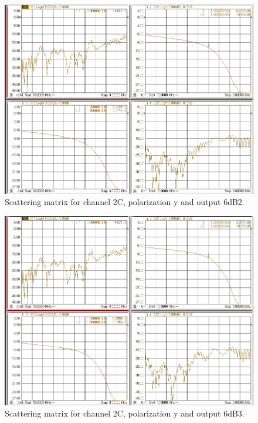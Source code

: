 \documentclass[12pt,a4paper,oneside]{article}
\begin{document}
\begin{figure}[H]
\centering
\includegraphics[width=0.9\linewidth]{VNA_results/2Cy_6dB2.png}
\caption{Scattering matrix for channel 2C, polarization y and output 6dB2.}
\label{fig:2Cy_6dB2}
\end{figure}


\begin{figure}[H]
\centering
\includegraphics[width=0.9\linewidth]{VNA_results/2Cy_6dB3.png}
\caption{Scattering matrix for channel 2C, polarization y and output 6dB3.}
\label{fig:2Cy_6dB3}
\end{figure}
\end{document}
